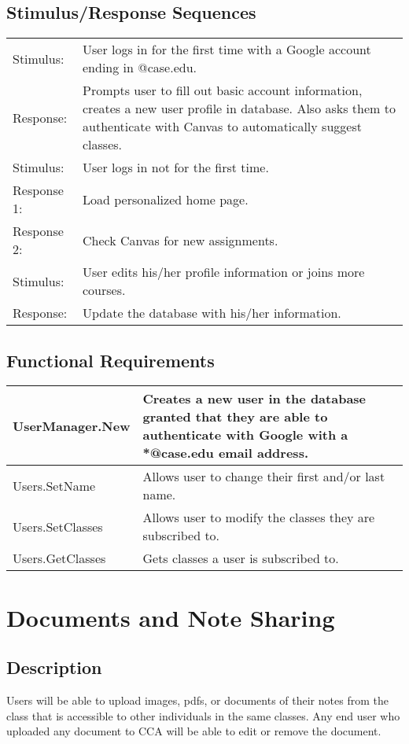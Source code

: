 \documentclass{scrreprt}
\begin{document}
\subsection{Stimulus/Response Sequences}
\begin{tabular}{| p{2cm} | p{12cm} | }
	\hline
	Stimulus:   & User logs in for the first time with a Google account ending in @case.edu. \\
	Response:   & Prompts user to fill out basic account information, creates a new user profile in database. Also asks them to authenticate with Canvas to automatically suggest classes. \\ \hline
	Stimulus:   & User logs in not for the first time. \\
	Response 1: & Load personalized home page. \\
	Response 2: & Check Canvas for new assignments. \\ \hline
	Stimulus:   & User edits his/her profile information or joins more courses. \\
	Response:   & Update the database with his/her information. \\
	\hline
\end{tabular}

\subsection{Functional Requirements}

\begin{tabular}{| p{3cm} | p{11cm} |}
\hline
UserManager.New & Creates a new user in the database granted that they are able to authenticate with Google with a *@case.edu email address. \\ \hline
Users.SetName & Allows user to change their first and/or last name. \\ \hline
Users.SetClasses & Allows user to modify the classes they are subscribed to. \\ \hline
Users.GetClasses & Gets classes a user is subscribed to. \\
\hline
\end{tabular}

\section{Documents and Note Sharing}
\subsection{Description}
Users will be able to upload images, pdfs, or documents of their notes from the class that is accessible to other individuals in the same classes. Any end user who uploaded any document to CCA will be able to edit or remove the document. 
\end{document}
